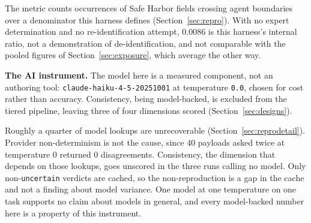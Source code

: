 The metric counts occurrences of Safe Harbor fields crossing agent boundaries over a denominator this
harness defines (Section~\ref{sec:repro}). With no expert determination and no re-identification
attempt, 0.0086 is this harness's internal ratio, not a demonstration of de-identification, and not
comparable with the pooled figures of Section~\ref{sec:exposure}, which average the other way.

\textbf{The AI instrument.} The model here is a measured component, not an authoring tool:
\texttt{claude-haiku-4-5-20251001} at temperature \texttt{0.0}, chosen for cost rather than accuracy.
Consistency, being model-backed, is excluded from the tiered pipeline, leaving three of four
dimensions scored (Section~\ref{sec:designs}).

Roughly a quarter of model lookups are unrecoverable (Section~\ref{sec:reprodetail}). Provider
non-determinism is not the cause, since 40 payloads asked twice at temperature 0 returned 0
disagreements. Consistency, the dimension that depends on those lookups, goes unscored in the
three runs calling no model. Only non-\texttt{uncertain} verdicts are cached, so the non-reproduction
is a gap in the cache and not a finding about model variance. One model at one temperature on one
task supports no claim about models in general, and every model-backed number here is a property of
this instrument.
